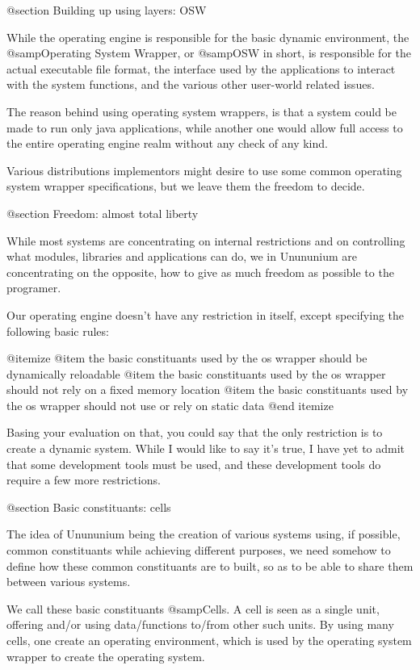 @section Building up using layers: OSW

 While the operating engine is responsible for the basic dynamic environment,
 the @samp{Operating System Wrapper}, or @samp{OSW} in short, is responsible
 for the actual executable file format, the interface used by the applications
 to interact with the system functions, and the various other user-world
 related issues.

 The reason behind using operating system wrappers, is that a system could be
 made to run only java applications, while another one would allow full access
 to the entire operating engine realm without any check of any kind.

 Various distributions implementors might desire to use some common operating
 system wrapper specifications, but we leave them the freedom to decide.


@section Freedom: almost total liberty

 While most systems are concentrating on internal restrictions and on
 controlling what modules, libraries and applications can do, we in Unununium
 are concentrating on the opposite, how to give as much freedom as possible to
 the programer.

 Our operating engine doesn't have any restriction in itself, except specifying
 the following basic rules:

 @itemize
 @item the basic constituants used by the os wrapper should be dynamically
  reloadable
 @item the basic constituants used by the os wrapper should not rely on a fixed
  memory location
 @item the basic constituants used by the os wrapper should not use or rely on
  static data
 @end itemize

 Basing your evaluation on that, you could say that the only restriction is to
 create a dynamic system.  While I would like to say it's true, I have yet to
 admit that some development tools must be used, and these development tools
 do require a few more restrictions.

@section Basic constituants: cells

 The idea of Unununium being the creation of various systems using, if
 possible, common constituants while achieving different purposes, we need
 somehow to define how these common constituants are to built, so as to be
 able to share them between various systems.

 We call these basic constituants @samp{Cells}.  A cell is seen as a single
 unit, offering and/or using data/functions to/from other such units. By
 using many cells, one create an operating environment, which is used by
 the operating system wrapper to create the operating system.



